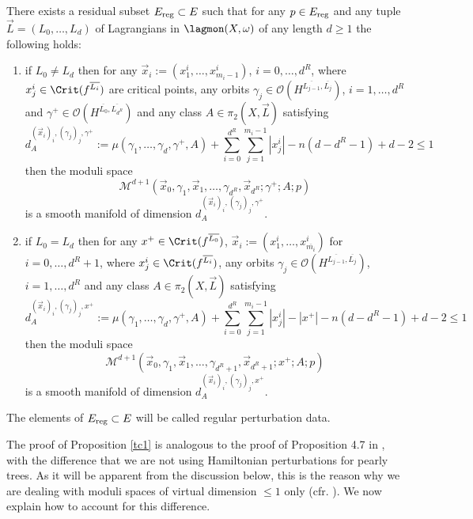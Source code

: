 	\begin{prop}\label{tc1}
		There exists a residual subset $E_\textnormal{reg}\subset E$ such that for any $p\in E_\textnormal{reg}$ and any tuple $\vec{L}=(L_0,\ldots,L_d)$ of Lagrangians in $\lagmon(X,\omega)$ of any length $d\geq 1$ the following holds:
		\begin{enumerate}
			\item if $L_0\neq L_d$ then for any $\vec{x}_i:=(x^i_1,\ldots,x^i_{m_i-1})$, $i=0,\ldots,d^R$, where $x^i_j\in \Crit(f^{\overline{L_i}})$ are critical points, any orbits $\gamma_j\in \mathcal{O}\left(H^{\overline{L_{j-1}},\overline{L_j}}\right)$, $i=1,\ldots,d^R$ and $\gamma^+\in \mathcal{O}\left(H^{\overline{L_0},\overline{L_{d^R}}}\right)$ and any class $A\in \pi_2(X,\vec{L})$ satisfying \begin{equation}\label{te1}
				d_{A}^{(\vec{x}_i)_i, (\gamma_j)_j,\gamma^+}:=\mu(\gamma_1,\ldots, \gamma_d,\gamma^+,A)+\sum_{i=0}^{d^R}\sum_{j=1}^{m_i-1}|x^i_j|-n(d-d^R-1)+d-2\leq 1
			\end{equation} then the moduli space $$\mathcal{M}^{d+1}\left(\vec{x}_0, \gamma_1, \vec{x}_1,\ldots,\gamma_{d^R}, \vec{x}_{d^R}; \gamma^+;A;p\right)$$ is a smooth manifold of dimension $d_{A}^{(\vec{x}_i)_i, (\gamma_j)_j,\gamma^+}$.
			\item if $L_0=L_d$ then for any $x^+\in \Crit(f^{\overline{L_0}})$, $\vec{x}_i:=(x_1^i,\ldots,x_{\overline{m_i}}^i)$ for $i=0,\ldots,d^R+1$, where $x^i_j\in \Crit(f^{\overline{L_i}})$, any orbits $\gamma_j\in \mathcal{O}\left(H^{\overline{L_{j-1}},\overline{L_j}}\right)$, $i=1,\ldots,d^R$ and any class $A\in \pi_2(X,\vec{L})$ satisfying 
			\begin{equation}\label{te2}
				d_{A}^{(\vec{x}_i)_i, (\gamma_j)_j,x^+}:=\mu(\gamma_1,\ldots, \gamma_d,\gamma^+,A)+\sum_{i=0}^{d^R}\sum_{j=1}^{m_i-1}|x^i_j|-|x^+|-n(d-d^R-1)+d-2\leq 1
			\end{equation}
			then the moduli space $$\mathcal{M}^{d+1}\left(\vec{x}_0, \gamma_1, \vec{x}_1,\ldots,\gamma_{d^R+1}, \vec{x}_{d^R+1}; x^+;A;p\right)$$ is a smooth manifold of dimension $d_{A}^{(\vec{x}_i)_i, (\gamma_j)_j,x^+}$.
		\end{enumerate}
	\end{prop}
	\begin{dfn}\label{defEreg}
		The elements of $E_\textnormal{reg}\subset E$ will be called regular perturbation data.
	\end{dfn}
	\noindent The proof of Proposition \ref{tc1} is analogous to the proof of Proposition 4.7 in \cite{Sheridan2011OnPants}, with the difference that we are not using Hamiltonian perturbations for pearly trees. As it will be apparent from the discussion below, this is the reason why we are dealing with moduli spaces of virtual dimension $\leq 1$ only (cfr. \cite{Bi-Co:Yasha-fest}). We now explain how to account for this difference.\\
